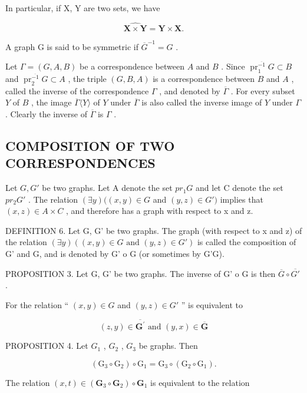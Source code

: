 In particular, if X, Y are two sets, we have

\[
\widehat {\mathbf {X} \times \mathbf {Y}} = \mathbf {Y} \times \mathbf {X}.
\]

A graph G is said to be symmetric if \(\overline{G}^{-1}=G\) .

Let \(\Gamma = (G, A, B)\) be a correspondence between \(A\) and \(B\) . Since \(\operatorname{pr}_1^{\overline{-1}} G \subset B\) and \(\operatorname{pr}_2^{\overline{-1}} G \subset A\) , the triple \((G, B, A)\) is a correspondence between \(B\) and \(A\) , called the inverse of the correspondence \(\Gamma\) , and denoted by \(\overline{\Gamma}\) . For every subset \(Y\) of \(B\) , the image \(\overline{\Gamma} \langle Y \rangle\) of \(Y\) under \(\overline{\Gamma}\) is also called the inverse image of \(Y\) under \(\Gamma\) . Clearly the inverse of \(\overline{\Gamma}\) is \(\Gamma\) .

\subsection{COMPOSITION OF TWO CORRESPONDENCES}

Let \(G, G'\) be two graphs. Let A denote the set \(pr_1G\) and let C denote the set \(pr_2G'\) . The relation \((\exists y)((x, y) \in G\) and \((y, z) \in G')\) implies that \((x, z) \in A \times C\) , and therefore has a graph with respect to x and z.

DEFINITION 6. Let G, G' be two graphs. The graph (with respect to x and z) of the relation \((\exists y)((x, y) \in G \text{ and } (y, z) \in G')\) is called the composition of G' and G, and is denoted by G' o G (or sometimes by G'G).

PROPOSITION 3. Let G, G' be two graphs. The inverse of G' o G is then \(\overline{G} \circ \overline{G'}\) .

For the relation `` \((x, y) \in G\) and \((y, z) \in G'\) '' is equivalent to

\[
(z, y) \in \overline {{\mathbf {G} ^ {\prime}}} \text {   and   } (y, x) \in \overline {{\mathbf {G}}}
\]

PROPOSITION 4. Let \(G_{1}\) , \(G_{2}\) , \(G_{3}\) be graphs. Then

\[
\left(\mathrm{G} _ {3} \circ \mathrm{G} _ {2}\right) \circ \mathrm{G} _ {1} = \mathrm{G} _ {3} \circ \left(\mathrm{G} _ {2} \circ \mathrm{G} _ {1}\right).
\]

The relation \((x, t) \in (\mathbf{G}_3 \circ \mathbf{G}_2) \circ \mathbf{G}_1\) is equivalent to the relation

